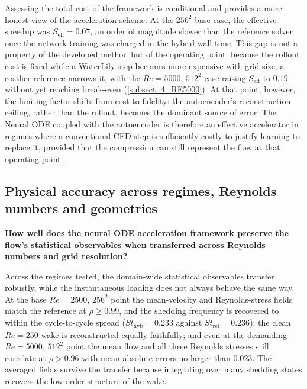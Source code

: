 


Assessing the total cost of the framework is conditional and provides a more honest view of the acceleration scheme. At the $256^2$ base case, the effective speedup was $S_\text{eff}=0.07$, an order of magnitude slower than the reference solver once the network training was charged in the hybrid wall time. This gap is not a property of the developed method but of the operating point: because the rollout cost is fixed while a WaterLily step becomes more expensive with grid size, a costlier reference narrows it, with the $Re=5000$, $512^2$ case raising $S_\text{eff}$ to $0.19$ without yet reaching break-even (\autoref{subsect: 4_RE5000}). At that point, however, the limiting factor shifts from cost to fidelity: the autoencoder's reconstruction ceiling, rather than the rollout, becomes the dominant source of error. The Neural ODE coupled with the autoencoder is therefore an effective accelerator in regimes where a conventional CFD step is sufficiently costly to justify learning to replace it, provided that the compression can still represent the flow at that operating point.



\subsection{Physical accuracy across regimes, Reynolds numbers and geometries}
\noindent\textbf{How well does the neural ODE acceleration framework preserve the flow’s statistical observables when transferred across Reynolds numbers and grid resolution?}

Across the regimes tested, the domain-wide statistical observables transfer robustly, while the instantaneous loading does not always behave the same way. At the base $Re=2500$, $256^2$ point the mean-velocity and Reynolds-stress fields match the reference at $\rho\geq0.99$, and the shedding frequency is recovered to within the cycle-to-cycle spread ($St_\text{hyb}=0.233$ against $St_\text{ref}=0.236$); the clean $Re=250$ wake is reconstructed equally faithfully; and even at the demanding $Re=5000$, $512^2$ point the mean flow and all three Reynolds stresses still correlate at $\rho>0.96$ with mean absolute errors no larger than $0.023$. The averaged fields survive the transfer because integrating over many shedding states recovers the low-order structure of the wake.

